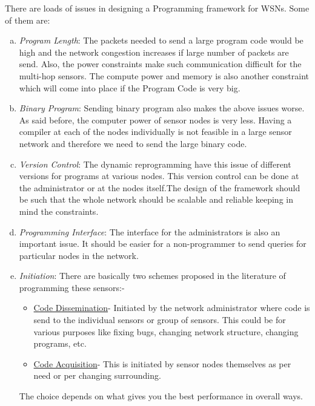 \documentclass[twocolumn]{article}
\begin{document}
There are loads of issues in designing a Programming framework for WSNs. Some of them are:
\begin{enumerate}[a)]
\item \emph{Program Length}: The packets needed to send a large program code would be high and the network congestion increases if large number of packets are send. Also, the power constraints make such communication difficult for the multi-hop sensors. The compute power and memory is also another constraint which will come into place if the Program Code is very big.

\item \emph{Binary Program}: Sending binary program also makes the above issues worse. As said before, the computer power of sensor nodes is very less. Having a compiler at each of the nodes individually is not feasible in a large sensor network and therefore we need to send the large binary code.

\item \emph{Version Control}: The dynamic reprogramming have this issue of different versions for programs at various nodes. This version control can be done at the administrator or at the nodes itself.The design of the framework should be such that the whole network should be scalable and reliable keeping in mind the constraints.

\item \emph{Programming Interface}: The interface for the administrators is also an important issue. It should be easier for a non-programmer to send queries for particular nodes in the network.

\item \emph{Initiation}: There are basically two schemes proposed in the literature of programming these sensors\cite{Wang06reprogrammingwireless}:-
\begin{itemize}
\item \underline{Code Dissemination}- Initiated by the network administrator where code is send to the individual sensors or group of sensors. This could be for various purposes like fixing bugs, changing network structure, changing programs, etc.

\item \underline{Code Acquisition}- This is initiated by sensor nodes themselves as per need or per changing surrounding.
\end{itemize}

The choice depends on what gives you the best performance in overall ways.
\end{enumerate}
\end{document}
